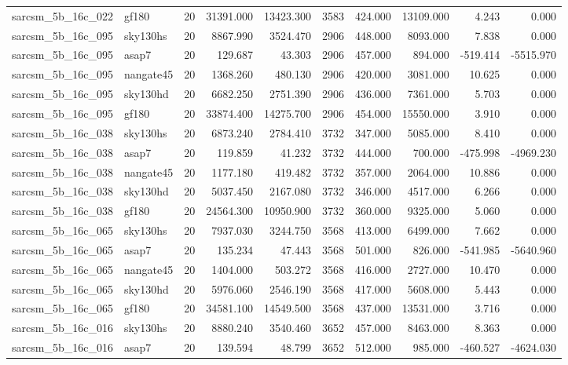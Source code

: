 \begin{longtable}{llrrrrrrrr}
sarcsm\_5b\_16c\_022 & gf180 & 20 & 31391.000 & 13423.300 & 3583 & 424.000 & 13109.000 & 4.243 & 0.000 \\
sarcsm\_5b\_16c\_095 & sky130hs & 20 & 8867.990 & 3524.470 & 2906 & 448.000 & 8093.000 & 7.838 & 0.000 \\
sarcsm\_5b\_16c\_095 & asap7 & 20 & 129.687 & 43.303 & 2906 & 457.000 & 894.000 & -519.414 & -5515.970 \\
sarcsm\_5b\_16c\_095 & nangate45 & 20 & 1368.260 & 480.130 & 2906 & 420.000 & 3081.000 & 10.625 & 0.000 \\
sarcsm\_5b\_16c\_095 & sky130hd & 20 & 6682.250 & 2751.390 & 2906 & 436.000 & 7361.000 & 5.703 & 0.000 \\
sarcsm\_5b\_16c\_095 & gf180 & 20 & 33874.400 & 14275.700 & 2906 & 454.000 & 15550.000 & 3.910 & 0.000 \\
sarcsm\_5b\_16c\_038 & sky130hs & 20 & 6873.240 & 2784.410 & 3732 & 347.000 & 5085.000 & 8.410 & 0.000 \\
sarcsm\_5b\_16c\_038 & asap7 & 20 & 119.859 & 41.232 & 3732 & 444.000 & 700.000 & -475.998 & -4969.230 \\
sarcsm\_5b\_16c\_038 & nangate45 & 20 & 1177.180 & 419.482 & 3732 & 357.000 & 2064.000 & 10.886 & 0.000 \\
sarcsm\_5b\_16c\_038 & sky130hd & 20 & 5037.450 & 2167.080 & 3732 & 346.000 & 4517.000 & 6.266 & 0.000 \\
sarcsm\_5b\_16c\_038 & gf180 & 20 & 24564.300 & 10950.900 & 3732 & 360.000 & 9325.000 & 5.060 & 0.000 \\
sarcsm\_5b\_16c\_065 & sky130hs & 20 & 7937.030 & 3244.750 & 3568 & 413.000 & 6499.000 & 7.662 & 0.000 \\
sarcsm\_5b\_16c\_065 & asap7 & 20 & 135.234 & 47.443 & 3568 & 501.000 & 826.000 & -541.985 & -5640.960 \\
sarcsm\_5b\_16c\_065 & nangate45 & 20 & 1404.000 & 503.272 & 3568 & 416.000 & 2727.000 & 10.470 & 0.000 \\
sarcsm\_5b\_16c\_065 & sky130hd & 20 & 5976.060 & 2546.190 & 3568 & 417.000 & 5608.000 & 5.443 & 0.000 \\
sarcsm\_5b\_16c\_065 & gf180 & 20 & 34581.100 & 14549.500 & 3568 & 437.000 & 13531.000 & 3.716 & 0.000 \\
sarcsm\_5b\_16c\_016 & sky130hs & 20 & 8880.240 & 3540.460 & 3652 & 457.000 & 8463.000 & 8.363 & 0.000 \\
sarcsm\_5b\_16c\_016 & asap7 & 20 & 139.594 & 48.799 & 3652 & 512.000 & 985.000 & -460.527 & -4624.030 \\

\end{longtable}
